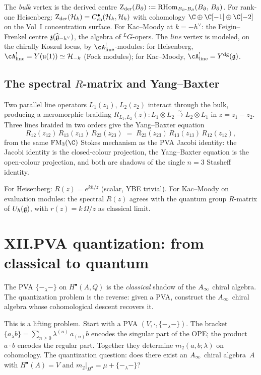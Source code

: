 The \emph{bulk} vertex is the derived centre
$\operatorname{Z}_{\mathrm{der}}(B_{\partial}) :=
\operatorname{RHom}_{B_{\partial}\text{-}B_{\partial}}(B_{\partial},\,B_{\partial})$.
For rank-one Heisenberg:
$\operatorname{Z}_{\mathrm{der}}(\mathcal{H}_k)=C^\bullet_{\mathrm{ch}}(\mathcal{H}_k,\mathcal{H}_k)$ with
cohomology $\C\oplus\C[-1]\oplus\C[-2]$ on the Vol~I concentration
surface.
For Kac--Moody at $k = -h^\vee$: the Feigin--Frenkel centre
$\mathfrak{z}(\widehat{\mathfrak{g}}_{-h^\vee})$, the algebra of
${}^L\!G$-opers. The \emph{line} vertex is modeled, on the
chirally Koszul locus, by $\cA^!_{\mathrm{line}}$-modules:
for Heisenberg,
$\cA^!_{\mathrm{line}} = Y(\mathfrak{u}(1)) \simeq \cH_{-k}$
(Fock modules); for Kac--Moody,
$\cA^!_{\mathrm{line}} = \Ydg(\fg)$.

\subsection*{The spectral $R$-matrix and Yang--Baxter}

Two parallel line operators $L_1(z_1)$, $L_2(z_2)$ interact
through the bulk, producing a meromorphic braiding
$R_{L_1, L_2}(z) \colon L_1 \otimes L_2
\xrightarrow{\sim}
L_2 \otimes L_1$ in $z = z_1 - z_2$.
Three lines braided in two orders give the Yang--Baxter equation
\[
R_{12}(z_{12})\,R_{13}(z_{13})\,R_{23}(z_{23})
\;=\;
R_{23}(z_{23})\,R_{13}(z_{13})\,R_{12}(z_{12}),
\]
from the same $\FM_3(\C)$ Stokes mechanism as the PVA Jacobi
identity: the Jacobi identity is the closed-colour projection,
the Yang--Baxter equation is the open-colour projection, and both
are shadows of the single $n = 3$ Stasheff identity.

For Heisenberg: $R(z) = e^{k\hbar/z}$ (scalar, YBE trivial).
For Kac--Moody on evaluation modules: the spectral $R(z)$ agrees
with the quantum group $R$-matrix of $U_\hbar(\mathfrak{g})$, with
$r(z) = k\,\Omega/z$ as classical limit.


\section*{XII.\quad PVA quantization: from classical to quantum}

The PVA $\{-_\lambda -\}$ on $H^\bullet(A, Q)$ is the
\emph{classical} shadow of the $A_\infty$ chiral algebra. The
quantization problem is the reverse: given a PVA, construct the
$A_\infty$ chiral algebra whose cohomological descent recovers it.

This is a lifting problem. Start with a PVA
$(V, \cdot, \{-_\lambda -\})$. The bracket
$\{a_\lambda b\} = \sum_{n \ge 0} \lambda^{(n)}\,a_{(n)}b$
encodes the singular part of the OPE; the product
$a \cdot b$ encodes the regular part. Together they determine
$m_2(a,b;\lambda)$ on cohomology. The quantization question: does
there exist an $A_\infty$ chiral algebra~$A$ with $H^\bullet(A) = V$
and $m_2|_{H^\bullet} = \mu + \{-_\lambda-\}$?

